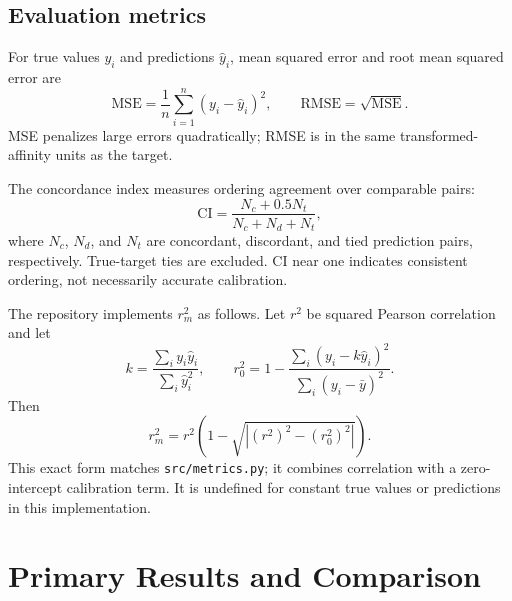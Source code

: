 \section{Evaluation metrics}
For true values $y_i$ and predictions $\hat y_i$, mean squared error and root mean squared error are
\begin{equation} \mathrm{MSE}=\frac1n\sum_{i=1}^n(y_i-\hat y_i)^2,\qquad \mathrm{RMSE}=\sqrt{\mathrm{MSE}}. \end{equation}
MSE penalizes large errors quadratically; RMSE is in the same transformed-affinity units as the target.

The concordance index measures ordering agreement over comparable pairs:
\begin{equation} \mathrm{CI}=\frac{N_{c}+0.5N_t}{N_{c}+N_d+N_t}, \end{equation}
where $N_c$, $N_d$, and $N_t$ are concordant, discordant, and tied prediction pairs, respectively. True-target ties are excluded. CI near one indicates consistent ordering, not necessarily accurate calibration.

The repository implements $r_m^2$ as follows. Let $r^2$ be squared Pearson correlation and let
\begin{equation} k=\frac{\sum_i y_i\hat y_i}{\sum_i\hat y_i^2},\qquad r_0^2=1-\frac{\sum_i(y_i-k\hat y_i)^2}{\sum_i(y_i-\bar y)^2}.\end{equation}
Then
\begin{equation}\label{eq:rm2} r_m^2=r^2\left(1-\sqrt{\left|(r^2)^2-(r_0^2)^2\right|}\right).\end{equation}
This exact form matches \texttt{src/metrics.py}; it combines correlation with a zero-intercept calibration term. It is undefined for constant true values or predictions in this implementation.

\chapter{Primary Results and Comparison}
